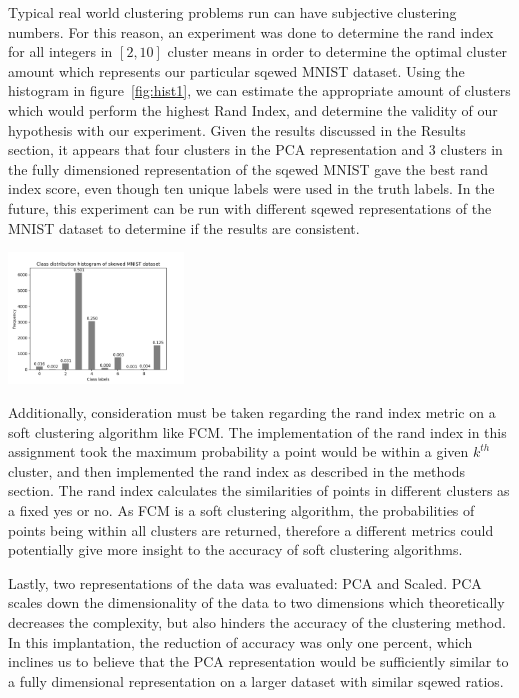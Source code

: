 Typical real world clustering problems run can have subjective clustering numbers. For this reason, an experiment was done to determine the rand index for all integers in $[2,10]$ cluster means in order to determine the optimal cluster amount which represents our particular sqewed MNIST dataset. Using the histogram in figure~\ref{fig:hist1}, we can estimate the appropriate amount of clusters which would perform the highest Rand Index, and determine the validity of our hypothesis with our experiment. Given the results discussed in the Results section, it appears that four clusters in the PCA representation and 3 clusters in the fully dimensioned representation of the sqewed MNIST gave the best rand index score, even though ten unique labels were used in the truth labels. In the future, this experiment can be run with different sqewed representations of the MNIST dataset to determine if the results are consistent. \par

\begin{center}
\includegraphics[width=0.35\textwidth]{class_histogram.png}
\end{center}

Additionally, consideration must be taken regarding the rand index metric on a soft clustering algorithm like FCM. The implementation of the rand index in this assignment took the maximum probability a point would be within a given $k^{th}$ cluster, and then implemented the rand index as described in the methods section. The rand index calculates the similarities of points in different clusters as a fixed yes or no. As FCM is a soft clustering algorithm, the probabilities of points being within all clusters are returned, therefore a different metrics could potentially give more insight to the accuracy of soft clustering algorithms. \par

Lastly, two representations of the data was evaluated: PCA and Scaled. PCA scales down the dimensionality of the data to two dimensions which theoretically decreases the complexity, but also hinders the accuracy of the clustering method. In this implantation, the reduction of accuracy was only one percent, which inclines us to believe that the PCA representation would be sufficiently similar to a fully dimensional representation on a larger dataset with similar sqewed ratios. 
